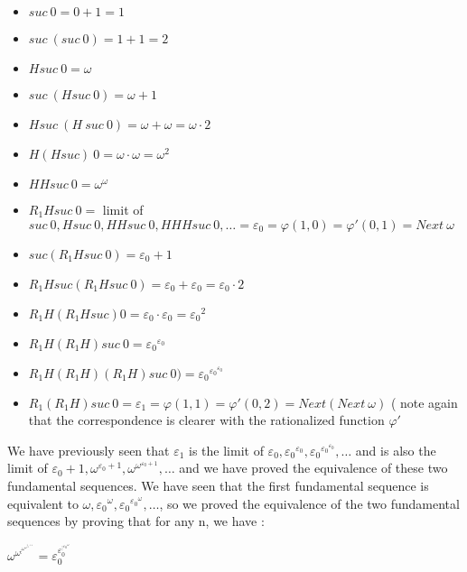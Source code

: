 \documentclass[10pt]{article}
\begin{document}
\begin{itemize}
     \setlength{\itemsep}{1pt}
     \setlength{\parskip}{0pt}
     \setlength{\parsep}{0pt}

\item \( suc\ 0 = 0 + 1 = 1 \)
\item \( suc\ (suc\ 0) = 1 + 1 = 2 \)
\item \( H suc\ 0 = \omega \)
\item \( suc\ (H suc\ 0) = \omega + 1 \)
\item \( H suc\ (H\ suc\ 0) = \omega + \omega = \omega \cdot 2 \)
\item \( H (H suc)\ 0 = \omega \cdot \omega = \omega^2 \)
\item \( H H suc\ 0 = \omega^\omega \)
\item \( R_1 H suc\ 0 = \) limit of \( suc\ 0, H suc\ 0, H H suc\ 0, H H H suc\ 0, \ldots = \varepsilon_0 = \varphi(1,0) = \varphi'(0,1) = Next\ \omega \)
\item \( suc (R_1 H suc\ 0) = \varepsilon_0 + 1 \)
\item \( R_1 H suc (R_1 H suc\ 0) = \varepsilon_0 + \varepsilon_0 = \varepsilon_0 \cdot 2 \)
\item \( R_1 H (R_1 H suc) 0 = \varepsilon_0 \cdot \varepsilon_0 = {\varepsilon_0}^2 \)
\item \( R_1 H (R_1 H) suc\ 0 = {\varepsilon_0}^{\varepsilon_0} \)
\item \( R_1 H (R_1 H) (R_1 H) suc\ 0 ) = {\varepsilon_0}^{{\varepsilon_0}^{\varepsilon_0}} \)
\item \( R_1 (R_1 H) suc\ 0 = \varepsilon_1 = \varphi(1,1) = \varphi'(0,2) = Next (Next\ \omega) \) ( note again that the correspondence is clearer with the rationalized function \( \varphi' \)

\end{itemize}

We have previously seen that \( \varepsilon_1 \) is the limit of \( \varepsilon_0, {\varepsilon_0}^{\varepsilon_0}, {\varepsilon_0}^{{\varepsilon_0}^{\varepsilon_0}}, \ldots \) and is also the limit of \( \varepsilon_0+1, \omega^{\varepsilon_0+1}, \omega^{\omega^{\varepsilon_0+1}}, \ldots \) and we have proved the equivalence of these two fundamental sequences. We have seen that the first fundamental sequence is equivalent to \( \omega, {\varepsilon_0}^\omega, {\varepsilon_0}^{{\varepsilon_0}^\omega}, \ldots \), so we proved the equivalence of the two fundamental sequences by proving that for any n, we have :

 \( \omega^{\omega^{\vdots^{\omega^{\omega^{\varepsilon_0+1}}}}} = \varepsilon_0^{\varepsilon_0^{\vdots^{{\varepsilon_0}^\omega}}} \)
\end{document}

